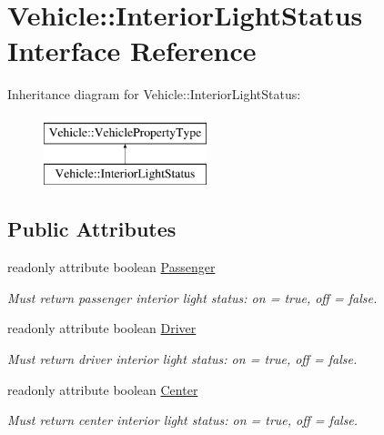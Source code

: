 \hypertarget{interfaceVehicle_1_1InteriorLightStatus}{\section{Vehicle\-:\-:Interior\-Light\-Status Interface Reference}
\label{interfaceVehicle_1_1InteriorLightStatus}
}
Inheritance diagram for Vehicle\-:\-:Interior\-Light\-Status\-:\begin{figure}[H]
\begin{center}
\leavevmode
\includegraphics[height=2.000000cm]{interfaceVehicle_1_1InteriorLightStatus}
\end{center}
\end{figure}
\subsection*{Public Attributes}
\begin{DoxyCompactItemize}
\item 
readonly attribute boolean \hyperlink{interfaceVehicle_1_1InteriorLightStatus_a22dca79c58a432b25241dd025ce27cd8}{Passenger}
\begin{DoxyCompactList}\small\item\em Must return passenger interior light status\-: on = true, off = false. \end{DoxyCompactList}\item 
readonly attribute boolean \hyperlink{interfaceVehicle_1_1InteriorLightStatus_a279c4729a24c08ac31a34cf6ca773688}{Driver}
\begin{DoxyCompactList}\small\item\em Must return driver interior light status\-: on = true, off = false. \end{DoxyCompactList}\item 
readonly attribute boolean \hyperlink{interfaceVehicle_1_1InteriorLightStatus_a86ef8e7a3d63b4b5ecbe91c7874b5067}{Center}
\begin{DoxyCompactList}\small\item\em Must return center interior light status\-: on = true, off = false. \end{DoxyCompactList}\end{DoxyCompactItemize}
